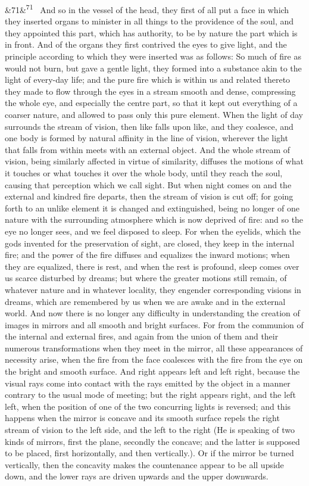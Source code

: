 \documentclass[12pt]{article}
\newcommand{\para}[1][]{\par\noindent\ifx&#1&\else\textsuperscript{\footnotesize #1}~\fi}
\begin{document}
\para[71] And so in the vessel of the head, they first of all put a face in which they inserted organs to minister in all things to the providence of the soul, and they appointed this part, which has authority, to be by nature the part which is in front. And of the organs they first contrived the eyes to give light, and the principle according to which they were inserted was as follows: So much of fire as would not burn, but gave a gentle light, they formed into a substance akin to the light of every-day life; and the pure fire which is within us and related thereto they made to flow through the eyes in a stream smooth and dense, compressing the whole eye, and especially the centre part, so that it kept out everything of a coarser nature, and allowed to pass only this pure element. When the light of day surrounds the stream of vision, then like falls upon like, and they coalesce, and one body is formed by natural affinity in the line of vision, wherever the light that falls from within meets with an external object. And the whole stream of vision, being similarly affected in virtue of similarity, diffuses the motions of what it touches or what touches it over the whole body, until they reach the soul, causing that perception which we call sight. But when night comes on and the external and kindred fire departs, then the stream of vision is cut off; for going forth to an unlike element it is changed and extinguished, being no longer of one nature with the surrounding atmosphere which is now deprived of fire: and so the eye no longer sees, and we feel disposed to sleep. For when the eyelids, which the gods invented for the preservation of sight, are closed, they keep in the internal fire; and the power of the fire diffuses and equalizes the inward motions; when they are equalized, there is rest, and when the rest is profound, sleep comes over us scarce disturbed by dreams; but where the greater motions still remain, of whatever nature and in whatever locality, they engender corresponding visions in dreams, which are remembered by us when we are awake and in the external world. And now there is no longer any difficulty in understanding the creation of images in mirrors and all smooth and bright surfaces. For from the communion of the internal and external fires, and again from the union of them and their numerous transformations when they meet in the mirror, all these appearances of necessity arise, when the fire from the face coalesces with the fire from the eye on the bright and smooth surface. And right appears left and left right, because the visual rays come into contact with the rays emitted by the object in a manner contrary to the usual mode of meeting; but the right appears right, and the left left, when the position of one of the two concurring lights is reversed; and this happens when the mirror is concave and its smooth surface repels the right stream of vision to the left side, and the left to the right (He is speaking of two kinds of mirrors, first the plane, secondly the concave; and the latter is supposed to be placed, first horizontally, and then vertically.). Or if the mirror be turned vertically, then the concavity makes the countenance appear to be all upside down, and the lower rays are driven upwards and the upper downwards.
\end{document}
